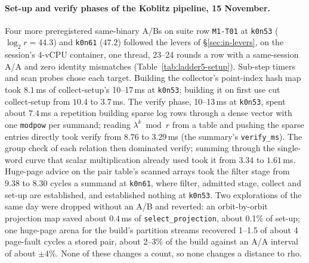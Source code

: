 \paragraph{Set-up and verify phases of the Koblitz pipeline, 15 November.}
Four more preregistered same-binary A/Bs on suite row \texttt{M1-T01} at
\texttt{k0n53} ($\log_2r=44.3$) and \texttt{k0n61} ($47.2$) followed the
levers of \S\ref{sec:in-levers}, on the session's 4-vCPU container, one
thread, 23--24 rounds a row with a same-session A/A and zero identity
mismatches (Table~\ref{tab:ladder5-setup}). Sub-step timers and scan
probes chose each target. Building the collector's point-index hash map
took $8.1$\,ms of collect-setup's 10--17\,ms at \texttt{k0n53}; building it
on first use cut collect-setup from $10.4$ to $3.7$\,ms. The verify phase,
10--13\,ms at \texttt{k0n53}, spent about $7.4$\,ms a repetition building
sparse log rows through a dense vector with one \texttt{modpow} per
summand; reading $\lambda^k \bmod r$ from a table and pushing the sparse
entries directly took verify from $8.76$ to $3.29$\,ms (the summary's
\texttt{verify\_ms}). The group check of each relation then dominated
verify; summing through the single-word curve that scalar multiplication
already used took it from $3.34$ to $1.61$\,ms. Huge-page advice on the
pair table's scanned arrays took the filter stage from $9.38$ to $8.30$
cycles a summand at \texttt{k0n61}, where filter, admitted stage, collect
and set-up are established, and established nothing at \texttt{k0n53}. Two
explorations of the same day were dropped without an A/B and reverted: an
orbit-by-orbit projection map saved about $0.4$\,ms of
\texttt{select\_projection}, about 0.1\% of set-up; one huge-page arena for
the build's partition streams recovered 1--1.5 of about 4 page-fault cycles
a stored pair, about 2--3\% of the build against an A/A interval of about
$\pm4\%$. None of these changes a count, so none changes a distance to rho.

